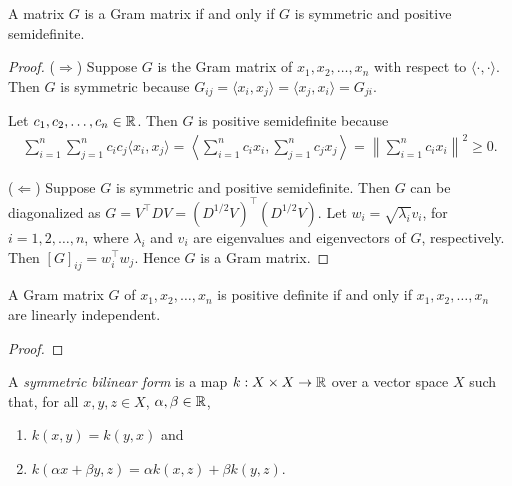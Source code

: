 \begin{theorem}
    \cite{horn2013matrix}
    \label{thm:gram-spsd}
    A matrix \(G\) is a Gram matrix if and only if \(G\) is symmetric and positive semidefinite.
\end{theorem}
\begin{proof}
    (\(\Rightarrow\))
    Suppose \(G\) is the Gram matrix of \(x_1, x_2, \dots, x_n\) with respect to \(\langle \cdot, \cdot \rangle\).
    Then \(G\) is symmetric because \(G_{ij} = \langle x_i, x_j \rangle = \langle x_j, x_i \rangle = G_{ji}\).
    
    Let \(c_1, c_2, \dots, c_n \in \mathbb{R}\).
    Then \(G\) is positive semidefinite because
    \begin{align}
        \sum_{i=1}^{n} \sum_{j=1}^{n} c_i c_j \langle x_i, x_j \rangle
        = \left\langle
            \sum_{i=1}^{n} c_i x_i, \sum_{j=1}^{n} c_j x_j
        \right\rangle
        = \left\|
            \sum_{i=1}^{n} c_i x_i
        \right\|^2
        \geq 0.
    \end{align}

    (\(\Leftarrow\))
    Suppose \(G\) is symmetric and positive semidefinite.
    Then \(G\) can be diagonalized as \(G = V^\top D V = (D^{1/2} V)^\top (D^{1/2} V)\).
    Let \(w_i = \sqrt{\lambda_i} v_i\), for \(i = 1,2,\dots, n\), where \(\lambda_i\) and \(v_i\) are eigenvalues and eigenvectors of \(G\), respectively.
    Then \([G]_{ij} = w_i^\top w_j\).
    Hence \(G\) is a Gram matrix.
\end{proof}

\begin{theorem}
    \cite{horn2013matrix}
    A Gram matrix \(G\) of \(x_1, x_2, \dots, x_n\) is positive definite if and only if \(x_1, x_2, \dots, x_n\) are linearly independent.
\end{theorem}
\begin{proof}
    
\end{proof}

\begin{definition}
    \label{def:symmetric-bilinear-form}
    A \textit{symmetric bilinear form} is a map \(k : X \times X \to \mathbb{R}\) over a vector space \(X\) such that, for all \(x,y,z \in X\), \(\alpha, \beta \in \mathbb{R}\),
    \begin{enumerate}
        \item \(k(x,y) = k(y,x)\) and
        \item \(k(\alpha x + \beta y, z) = \alpha k(x,z) + \beta k(y,z)\).
    \end{enumerate}
\end{definition}

